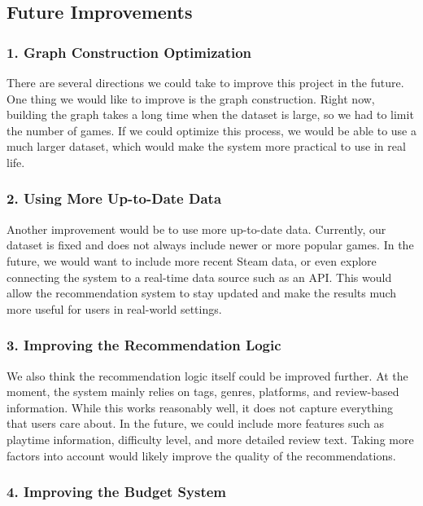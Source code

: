 \documentclass[fontsize=11pt]{article}
\begin{document}
\subsection*{Future Improvements}

\subsubsection*{1. Graph Construction Optimization}

There are several directions we could take to improve this project in the future. One thing we would like to improve is the graph construction. Right now, building the graph takes a long time when the dataset is large, so we had to limit the number of games. If we could optimize this process, we would be able to use a much larger dataset, which would make the system more practical to use in real life.

\subsubsection*{2. Using More Up-to-Date Data}

Another improvement would be to use more up-to-date data. Currently, our dataset is fixed and does not always include newer or more popular games. In the future, we would want to include more recent Steam data, or even explore connecting the system to a real-time data source such as an API. This would allow the recommendation system to stay updated and make the results much more useful for users in real-world settings.

\subsubsection*{3. Improving the Recommendation Logic}

We also think the recommendation logic itself could be improved further. At the moment, the system mainly relies on tags, genres, platforms, and review-based information. While this works reasonably well, it does not capture everything that users care about. In the future, we could include more features such as playtime information, difficulty level, and more detailed review text. Taking more factors into account would likely improve the quality of the recommendations.

\subsubsection*{4. Improving the Budget System}
\end{document}
